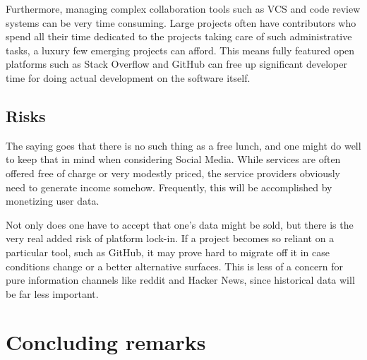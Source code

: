 \documentclass[a4paper,11pt]{article} %
\begin{document}
Furthermore, managing complex collaboration tools such as VCS and code
review systems can be very time consuming. Large projects often have
contributors who spend all their time dedicated to the projects taking
care of such administrative tasks, a luxury few emerging projects can
afford. This means fully featured open platforms such as Stack
Overflow and GitHub can free up significant developer time for doing
actual development on the software itself.

\subsection{Risks}

The saying goes that there is no such thing as a free lunch, and one
might do well to keep that in mind when considering Social
Media. While services are often offered free of charge or very
modestly priced, the service providers obviously need to generate
income somehow. Frequently, this will be accomplished by monetizing
user data.

Not only does one have to accept that one's data might be sold, but
there is the very real added risk of platform lock-in. If a project
becomes so reliant on a particular tool, such as GitHub, it may prove
hard to migrate off it in case conditions change or a better
alternative surfaces. This is less of a concern for pure information
channels like reddit and Hacker News, since historical data will be
far less important.

\section{Concluding remarks}

\newpage
\printbibliography
\end{document}
